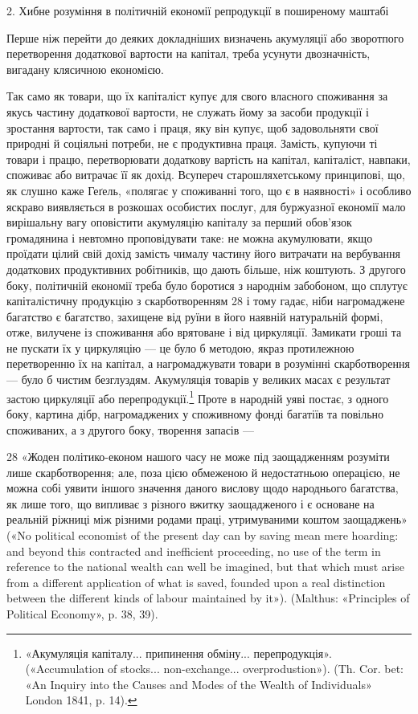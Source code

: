 2. Хибне розуміння в політичній економії репродукції
в поширеному маштабі

Перше ніж перейти до деяких докладніших визначень акумуляції
або зворотпого перетворення додаткової вартости на капітал,
треба усунути двозначність, вигадану клясичною економією.

Так само як товари, що їх капіталіст купує для свого власного
споживання за якусь частину додаткової вартости, не служать
йому за засоби продукції і зростання вартости, так само і праця,
яку він купує, щоб задовольняти свої природні й соціяльні
потреби, не є продуктивна праця. Замість, купуючи ті товари
і працю, перетворювати додаткову вартість на капітал, капіталіст,
навпаки, споживає або витрачає її як дохід. Всупереч
старошляхетському принципові, що, як слушно каже Геґель,
«полягає у споживанні того, що є в наявності» і особливо яскраво
виявляється в розкошах особистих послуг, для буржуазної економії
мало вирішальну вагу оповістити акумуляцію капіталу за
перший обов’язок громадянина і невтомно проповідувати таке:
не можна акумулювати, якщо проїдати цілий свій дохід замість
чималу частину його витрачати на вербування додаткових продуктивних
робітників, що дають більше, ніж коштують. З другого
боку, політичній економії треба було боротися з народнім
забобоном, що сплутує капіталістичну продукцію з скарботворенням
28 і тому гадає, ніби нагромаджене багатство є багатство, захищене
від руїни в його наявній натуральній формі, отже, вилучене
із споживання або врятоване і від циркуляції. Замикати гроші
та не пускати їх у циркуляцію — це було б методою, якраз протилежною
перетворенню їх на капітал, а нагромаджувати товари
в розумінні скарботворення — було б чистим безглуздям.
Акумуляція товарів у великих масах є результат застою циркуляції
або перепродукції.\footnote{
«Акумуляція капіталу... припинення обміну... перепродукція».
(«Accumulation of stocks... non-exchange... overprodustion»). (Th. Cor.
bet: «An Inquiry into the Causes and Modes of the Wealth of Individuals» London
1841, p. 14).
} Проте в народній уяві постає, з одного
боку, картина дібр, нагромаджених у споживному фонді багатіїв
та повільно споживаних, а з другого боку, творення запасів —

28 «Жоден політико-економ нашого часу не може під заощадженням
розуміти лише скарботворення; але, поза цією обмеженою й недостатньою
операцією, не можна собі уявити іншого значення даного
вислову щодо народнього багатства, як лише того, що випливає з різного
вжитку заощадженого і є основане на реальній ріжниці між різними
родами праці, утримуваними коштом заощаджень» («No political
economist of the present day can by saving mean mere hoarding: and
beyond this contracted and inefficient proceeding, no use of the term in reference
to the national wealth can well be imagined, but that which must
arise from a different application of what is saved, founded upon a real
distinction between the different kinds of labour maintained by it»).
(Malthus: «Principles of Political Economy», p. 38, 39).